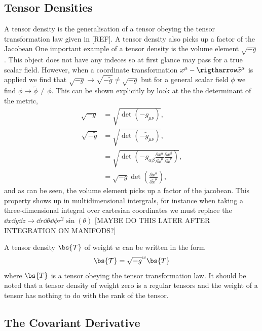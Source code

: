 \subsection{Tensor Densities}
A tensor density is the generalisation of a tensor obeying the tensor transformation law given in [REF]. A tensor density also picks up a factor of the Jacobean
One important example of a tensor density is the volume element $\sqrt{-g}$. This object does not have any indeces so at first glance may pass for a true scalar field. However, when a coordinate transformation $x^\mu -\rigtharrow \tilde{x}^\mu$ is applied we find that $\sqrt{-g} \rightarrow \sqrt{-\tilde{g}} \neq \sqrt{-g}$ but for a general scalar field $\phi$ we find $\phi \rightarrow \tilde{\phi} \neq \phi$. This can be shown explicitly by look at the the determinant of the metric,
\begin{align}
\sqrt{-g} &= \sqrt{\det({-g_{\mu\nu}})},\\
\sqrt{-\tilde{g}} &= \sqrt{\det(-\tilde{g}_{\mu\nu})},\\
&= \sqrt{\det\left(-g_{\alpha \beta} \frac{\partial x^\alpha}{\partial \tilde{x}^\mu}  \frac{\partial x^\beta}{\partial \tilde{x}^\nu} \right)} ,\\
&= \sqrt{-g} \det\left(\frac{\partial x^\alpha}{\partial \tilde{x}^\mu}\right)\label{eq:rootgtrans},
\end{align}
and as can be seen, the volume element picks up a factor of the jacobean. This property shows up in multidimensional intergrals, for instance when taking a three-dimensional integral over cartesian coordinates we must replace the $\dd x \dd y \dd z \rightarrow \dd r \dd \theta \dd \phi r^2 \sin(\theta)$ [MAYBE DO THIS LATER AFTER INTEGRATION ON MANIFODS?]

A tensor density $\bs{\mathcal{T}}$ of weight $w$ can be written in the form 
\begin{equation}\bs{\mathcal{T}} = \sqrt{-g}^w\bs{T}\end{equation}
 where $\bs{T}$ is a tensor obeying the tensor transformation law. It should be noted that a tensor density of weight zero is a regular tensors and the weight of a tensor has nothing to do with the rank of the tensor.







\subsection{The Covariant Derivative}


